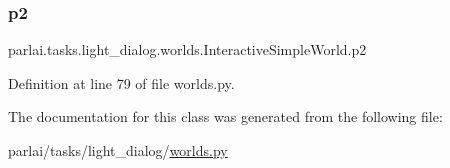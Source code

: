 \subsubsection{\texorpdfstring{p2}{p2}}
{\footnotesize\ttfamily parlai.\+tasks.\+light\+\_\+dialog.\+worlds.\+Interactive\+Simple\+World.\+p2}



Definition at line 79 of file worlds.\+py.



The documentation for this class was generated from the following file\+:\begin{DoxyCompactItemize}
\item 
parlai/tasks/light\+\_\+dialog/\hyperlink{parlai_2tasks_2light__dialog_2worlds_8py}{worlds.\+py}\end{DoxyCompactItemize}
